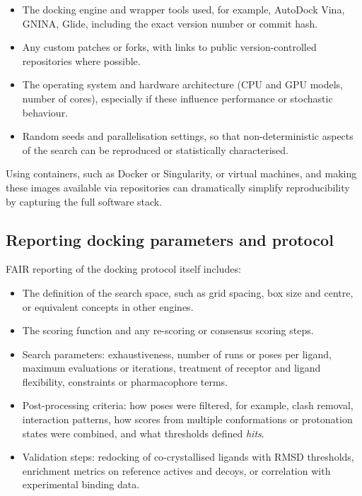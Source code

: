 \documentclass[12pt]{article}
\begin{document}
\begin{itemize}
  \item The docking engine and wrapper tools used, for example, AutoDock Vina, GNINA, Glide, including the exact version number or commit hash.
  \item Any custom patches or forks, with links to public version-controlled repositories where possible.
  \item The operating system and hardware architecture (CPU and GPU models, number of cores), especially if these influence performance or stochastic behaviour.
  \item Random seeds and parallelisation settings, so that non-deterministic aspects of the search can be reproduced or statistically characterised.
\end{itemize}

Using containers, such as Docker or Singularity, or virtual machines, and making these images available via repositories can dramatically simplify reproducibility by capturing the full software stack\cite{CH12_reproWorkflows2017,CH12_toolsRepro2016}.

\subsection{Reporting docking parameters and protocol}

FAIR reporting of the docking protocol itself includes:

\begin{itemize}
  \item The definition of the search space, such as grid spacing, box size and centre, or equivalent concepts in other engines.
  \item The scoring function and any re-scoring or consensus scoring steps.
  \item Search parameters: exhaustiveness, number of runs or poses per ligand, maximum evaluations or iterations, treatment of receptor and ligand flexibility, constraints or pharmacophore terms.
  \item Post-processing criteria: how poses were filtered, for example, clash removal, interaction patterns, how scores from multiple conformations or protonation states were combined, and what thresholds defined \emph{hits}.
  \item Validation steps: redocking of co-crystallised ligands with RMSD thresholds, enrichment metrics on reference actives and decoys, or correlation with experimental binding data.
\end{itemize}
\end{document}
